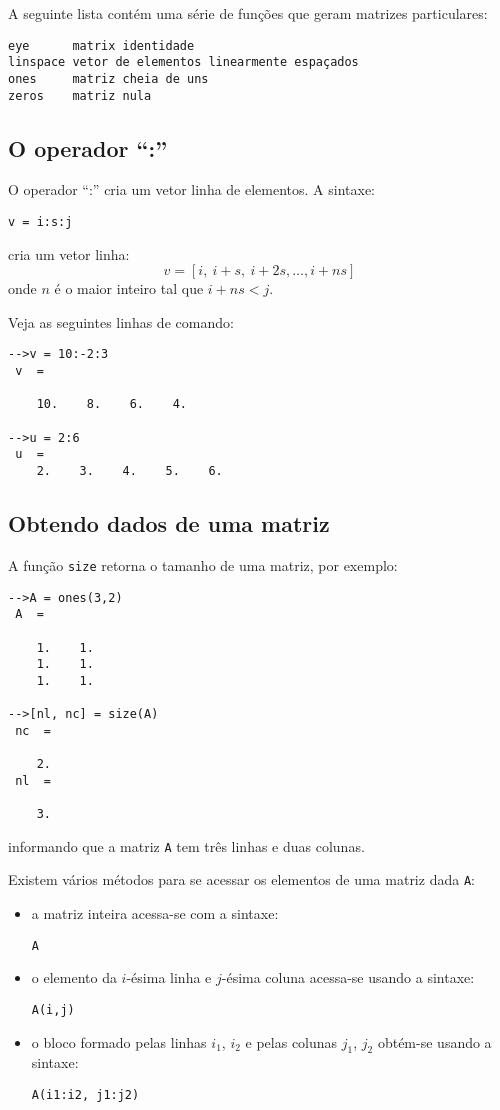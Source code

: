 \documentclass[main.tex]{subfiles}
\begin{document}
A seguinte lista contém uma série de funções que geram matrizes particulares:
\begin{verbatim}
eye      matrix identidade
linspace vetor de elementos linearmente espaçados
ones     matriz cheia de uns
zeros    matriz nula
\end{verbatim}

\subsection{O operador ``:''}

O operador ``:'' cria um vetor linha de elementos. A sintaxe:
\begin{verbatim}
v = i:s:j
\end{verbatim}
cria um vetor linha:
\begin{equation*}
  v = [i,~i+s,~i+2s,\dotsc, i+ns]
\end{equation*}
onde $n$ é o maior inteiro tal que $i + ns < j$.

\begin{ex}
Veja as seguintes linhas de comando:
\begin{verbatim}
-->v = 10:-2:3
 v  =
 
    10.    8.    6.    4.  
 
-->u = 2:6
 u  =
    2.    3.    4.    5.    6.
\end{verbatim}
\end{ex}

\subsection{Obtendo dados de uma matriz}

A função \verb+size+ retorna o tamanho de uma matriz, por exemplo:
\begin{verbatim}
-->A = ones(3,2)
 A  =
 
    1.    1.  
    1.    1.  
    1.    1.  
 
-->[nl, nc] = size(A)
 nc  =
 
    2.  
 nl  =
 
    3.  
\end{verbatim}
informando que a matriz \verb+A+ tem três linhas e duas colunas.

Existem vários métodos para se acessar os elementos de uma matriz dada \verb+A+:
\begin{itemize}
\item a matriz inteira acessa-se com a sintaxe:
\begin{verbatim}
A
\end{verbatim}
\item o elemento da $i$-ésima linha e $j$-ésima coluna acessa-se usando a sintaxe:
\begin{verbatim}
A(i,j)
\end{verbatim}
\item o bloco formado pelas linhas $i_1$, $i_2$ e pelas colunas $j_1$, $j_2$ obtém-se usando a sintaxe:
\begin{verbatim}
A(i1:i2, j1:j2)
\end{verbatim}
\end{itemize}
\end{document}
